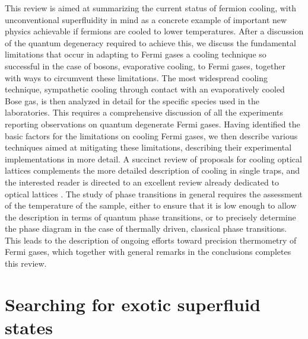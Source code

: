 \documentclass[pra,letterpaper,twocolumn,showpacs,superscriptaddress]{revtex4}
\begin{document}
This review is aimed at summarizing the current status of fermion cooling, with unconventional superfluidity in 
mind as a concrete example of important new physics achievable if fermions are cooled to lower temperatures. 
After a discussion of the quantum degeneracy required to achieve this, we discuss the fundamental limitations 
that occur in adapting to Fermi gases a cooling technique so successful in the case of bosons, evaporative cooling, to Fermi gases, together 
with ways to circumvent these limitations. The most widespread cooling technique, sympathetic cooling through contact with an evaporatively 
cooled Bose gas, is then analyzed in detail for the specific species used in the laboratories. 
This requires a comprehensive discussion of all the experiments reporting observations on quantum degenerate Fermi gases. 
Having identified the basic factors for the limitations on cooling Fermi gases, we then describe various techniques aimed at 
mitigating these limitations, describing their experimental implementations in more detail. A succinct review of proposals for 
cooling optical lattices complements the more detailed description of cooling in single traps, and the interested reader is directed to an excellent review 
already dedicated to optical lattices \cite{McKayRev2011}. The study of phase transitions in general requires the assessment of the temperature of 
the sample, either to ensure that it is low enough to allow the description in terms of quantum phase transitions, or to precisely determine the 
phase diagram in the case of thermally driven, classical phase transitions. This leads to the description of ongoing efforts toward precision 
thermometry of Fermi gases, which together with general remarks in the conclusions completes this review. 

\section{\bf{Searching for exotic superfluid states}}
\end{document}
